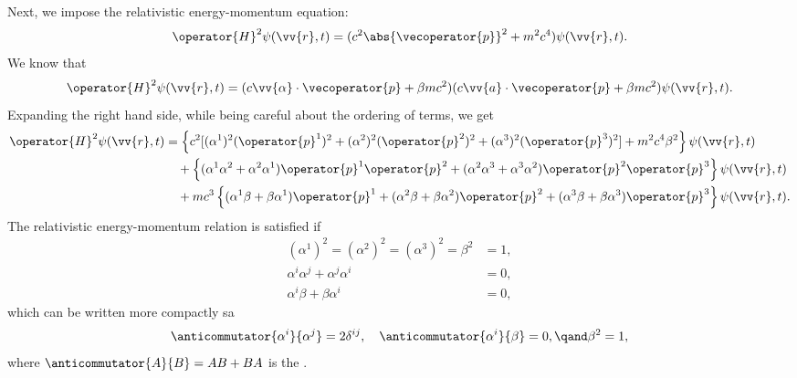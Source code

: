 \documentclass[fleqn]{NotesClass}
\begin{document}
\begin{appendices}
        Next, we impose the relativistic energy-momentum equation:
        \begin{equation}
            \operator{H}^2\psi(\vv{r}, t) = (c^2\abs{\vecoperator{p}}^2 + m^2c^4)\psi(\vv{r}, t).
        \end{equation}
        We know that
        \begin{equation}
            \operator{H}^2\psi(\vv{r}, t) = (c\vv{\alpha} \cdot \vecoperator{p} + \beta mc^2)(c\vv{a} \cdot \vecoperator{p} + \beta mc^2)\psi(\vv{r}, t).
        \end{equation}
        Expanding the right hand side, while being careful about the ordering of terms, we get
        \begin{align}
            \operator{H}^2\psi(\vv{r}, t) &= \left\{ c^2[(\alpha^1)^2(\operator{p}^1)^2 + (\alpha^2)^2(\operator{p}^2)^2 + (\alpha^3)^2(\operator{p}^3)^2] + m^2c^4\beta^2 \right\} \psi(\vv{r}, t)\\
            & \quad + \left\{ (\alpha^1\alpha^2 + \alpha^2\alpha^1)\operator{p}^1\operator{p}^2 + (\alpha^2\alpha^3 + \alpha^3\alpha^2)\operator{p}^2\operator{p}^3 \right\}\psi(\vv{r}, t)\\
            & \quad + mc^3\left\{ (\alpha^1\beta + \beta\alpha^1)\operator{p}^1 + (\alpha^2\beta + \beta\alpha^2)\operator{p}^2 + (\alpha^3\beta + \beta\alpha^3)\operator{p}^3 \right\}\psi(\vv{r}, t).
        \end{align}
        The relativistic energy-momentum relation is satisfied if
        \begin{align}
            (\alpha^1)^2 = (\alpha^2)^2 = (\alpha^3)^2 = \beta^2 &= 1,\\
            \alpha^i\alpha^j + \alpha^j\alpha^i &= 0,\\
            \alpha^i\beta + \beta\alpha^i &= 0,
        \end{align}
        which can be written more compactly sa
        \begin{equation}
            \anticommutator{\alpha^i}{\alpha^j} = 2\delta^{ij}, \quad \anticommutator{\alpha^i}{\beta} = 0, \qand \beta^2 = 1,
        \end{equation}
        where \(\anticommutator{A}{B} = AB + BA\) is the .
        

\end{appendices}
\end{document}
